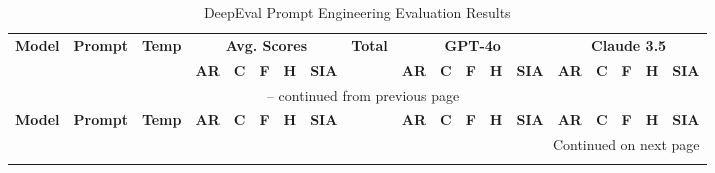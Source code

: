 \begin{landscape}
    \small
    \setlength{\tabcolsep}{4pt}       %
    \renewcommand{\arraystretch}{0.9}  %
    \setlength{\LTleft}{0pt}          %
    \setlength{\LTright}{0pt}         %
    \begin{longtable}{|l|c|c|ccccc|c|ccccc|ccccc|}
        \caption{DeepEval Prompt Engineering Evaluation Results} \\
        \toprule
        \textbf{Model} & \textbf{Prompt} & \textbf{Temp} & \multicolumn{5}{c|}{\textbf{Avg. Scores}} & \textbf{Total} & \multicolumn{5}{c|}{\textbf{GPT-4o}} & \multicolumn{5}{c|}{\textbf{Claude 3.5}} \\
        & & & \textbf{AR} & \textbf{C} & \textbf{F} & \textbf{H} & \textbf{SIA} & & \textbf{AR} & \textbf{C} & \textbf{F} & \textbf{H} & \textbf{SIA} & \textbf{AR} & \textbf{C} & \textbf{F} & \textbf{H} & \textbf{SIA} \\
        \midrule
        \endfirsthead

        \multicolumn{19}{c}{\tablename\ \thetable{} -- continued from previous page} \\
        \midrule
        \textbf{Model} & \textbf{Prompt} & \textbf{Temp} & \textbf{AR} & \textbf{C} & \textbf{F} & \textbf{H} & \textbf{SIA} & & \textbf{AR} & \textbf{C} & \textbf{F} & \textbf{H} & \textbf{SIA} & \textbf{AR} & \textbf{C} & \textbf{F} & \textbf{H} & \textbf{SIA} \\
        \midrule
        \endhead

        \midrule
        \multicolumn{19}{r}{Continued on next page} \\
        \endfoot


\end{longtable}
\end{landscape}
